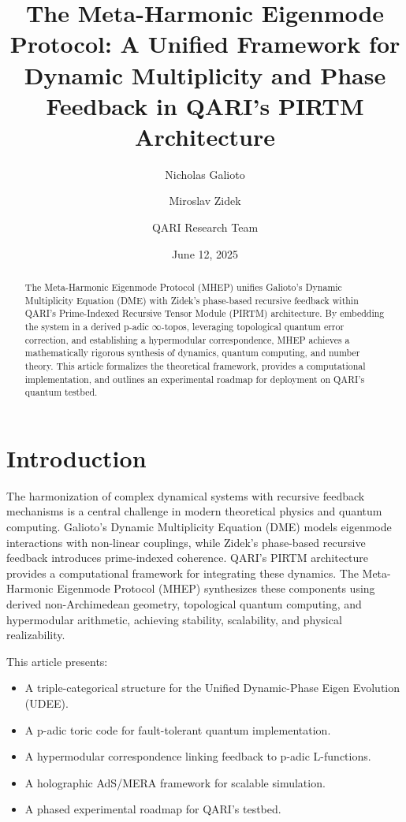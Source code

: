 \documentclass[11pt]{article}
\title{The Meta-Harmonic Eigenmode Protocol: A Unified Framework for Dynamic Multiplicity and Phase Feedback in QARI's PIRTM Architecture}
\author{Nicholas Galioto \and Miroslav Zidek \and QARI Research Team}
\date{June 12, 2025}
\theoremstyle{plain}
\theoremstyle{definition}
\begin{document}
\maketitle

\begin{abstract}
The Meta-Harmonic Eigenmode Protocol (MHEP) unifies Galioto's Dynamic Multiplicity Equation (DME) with Zidek's phase-based recursive feedback within QARI’s Prime-Indexed Recursive Tensor Module (PIRTM) architecture. By embedding the system in a derived p-adic \(\infty\)-topos, leveraging topological quantum error correction, and establishing a hypermodular correspondence, MHEP achieves a mathematically rigorous synthesis of dynamics, quantum computing, and number theory. This article formalizes the theoretical framework, provides a computational implementation, and outlines an experimental roadmap for deployment on QARI’s quantum testbed.
\end{abstract}

\section{Introduction}
The harmonization of complex dynamical systems with recursive feedback mechanisms is a central challenge in modern theoretical physics and quantum computing. Galioto’s Dynamic Multiplicity Equation (DME) models eigenmode interactions with non-linear couplings, while Zidek’s phase-based recursive feedback introduces prime-indexed coherence. QARI’s PIRTM architecture provides a computational framework for integrating these dynamics. The Meta-Harmonic Eigenmode Protocol (MHEP) synthesizes these components using derived non-Archimedean geometry, topological quantum computing, and hypermodular arithmetic, achieving stability, scalability, and physical realizability.

This article presents:
\begin{itemize}
    \item A triple-categorical structure for the Unified Dynamic-Phase Eigen Evolution (UDEE).
    \item A p-adic toric code for fault-tolerant quantum implementation.
    \item A hypermodular correspondence linking feedback to p-adic L-functions.
    \item A holographic AdS/MERA framework for scalable simulation.
    \item A phased experimental roadmap for QARI’s testbed.
\end{itemize}
\end{document}
